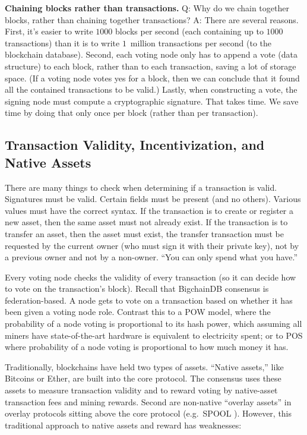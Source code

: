 \medskip
\noindent\textbf{Chaining blocks rather than transactions.} 
Q: Why do we chain together blocks, rather than chaining together transactions? 
A: There are several reasons.
First, it's easier to write $1000$ blocks per second (each containing up to $1000$ transactions) than it is to write $1$~million transactions per second (to the blockchain database).
Second, each voting node only has to append a vote (data structure) to each block, rather than to each transaction, saving a lot of storage space. (If a voting node votes yes for a block, then we can conclude that it found all the contained transactions to be valid.) Lastly, when constructing a vote, the signing node must compute a cryptographic signature. That takes time. We save time by doing that only once per block (rather than per transaction).


\subsection{Transaction Validity, Incentivization, and Native Assets}
There are many things to check when determining if a transaction is valid. Signatures must be valid. Certain fields must be present (and no others). Various values must have the correct syntax.
If the transaction is to create or register a new asset, then the same asset must not already exist.
If the transaction is to transfer an asset, then the asset must exist, the transfer transaction must be requested by the current owner (who must sign it with their private key), not by a previous owner and not by a non-owner. ``You can only spend what you have.''

Every voting node checks the validity of every transaction (so it can decide how to vote on the transaction's block). 
Recall that BigchainDB consensus is federation-based.
A node gets to vote on a transaction based on whether it has been given a voting node role.
Contrast this to a POW model, where the probability of a node voting is proportional to its hash power, which assuming all miners have state-of-the-art hardware is equivalent to electricity spent; or to POS where probability of a node voting is proportional to how much money it has.

Traditionally, blockchains have held two types of assets. 
“Native assets,” like Bitcoins or Ether, are built into the core protocol. 
The consensus uses these assets to measure transaction validity and to reward voting by native-asset transaction fees and mining rewards. 
Second are non-native “overlay assets” in overlay protocols sitting above the core protocol (e.g.~SPOOL \cite{dejonghe_spool}).
However, this traditional approach to native assets and reward has weaknesses:

